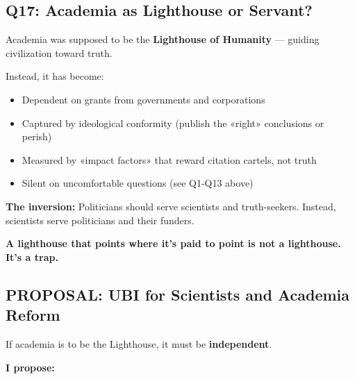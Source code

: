 \documentclass[11pt,a4paper]{article}
\theoremstyle{definition}
\theoremstyle{remark}
\begin{document}
\subsection{Q17: Academia as Lighthouse or Servant?}

Academia was supposed to be the \textbf{Lighthouse of Humanity} — guiding civilization toward truth.

Instead, it has become:
\begin{itemize}
\item Dependent on grants from governments and corporations
\item Captured by ideological conformity (publish the «right» conclusions or perish)
\item Measured by «impact factors» that reward citation cartels, not truth
\item Silent on uncomfortable questions (see Q1-Q13 above)
\end{itemize}

\textbf{The inversion:} Politicians should serve scientists and truth-seekers. Instead, scientists serve politicians and their funders.

\textbf{A lighthouse that points where it's paid to point is not a lighthouse. It's a trap.}

\subsection{PROPOSAL: UBI for Scientists and Academia Reform}

If academia is to be the Lighthouse, it must be \textbf{independent}.

\textbf{I propose:}
\end{document}
